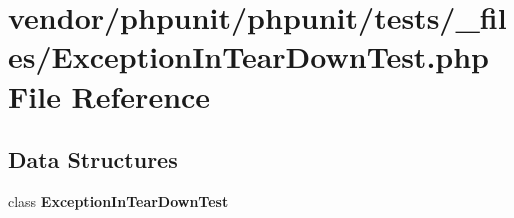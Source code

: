 \section{vendor/phpunit/phpunit/tests/\+\_\+files/\+Exception\+In\+Tear\+Down\+Test.php File Reference}
\label{_exception_in_tear_down_test_8php}
\subsection*{Data Structures}
\begin{DoxyCompactItemize}
\item 
class {\bf Exception\+In\+Tear\+Down\+Test}
\end{DoxyCompactItemize}
